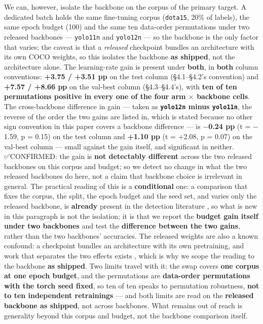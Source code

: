 \documentclass[pdflatex,sn-mathphys-ay]{sn-jnl}
\begin{document}
We can, however, isolate the backbone on the corpus of the primary target. A dedicated batch holds the same fine-tuning corpus (\texttt{dota15}, 20\% of labels), the same epoch budget (100) and the same ten data-order permutations under two released backbones --- \texttt{yolo11n} and \texttt{yolo12n} --- so the backbone is the only factor that varies; the caveat is that a \emph{released} checkpoint bundles an architecture with its own COCO weights, so this isolates the backbone \textbf{as shipped}, not the architecture alone. The learning-rate gain is present under \textbf{both}, in \textbf{both} column conventions: \textbf{+3.75 / +3.51 pp} on the test column (\S{}4.1--\S{}4.2's convention) and \textbf{+7.57 / +8.66 pp} on the val-best column (\S{}4.3--\S{}4.4's), with \textbf{ten of ten permutations positive in every one of the four arm \ensuremath{\times} backbone cells}. The cross-backbone difference in gain --- taken as \textbf{\texttt{yolo12n} minus \texttt{yolo11n}}, the reverse of the order the two gains are listed in, which is stated because no other sign convention in this paper covers a backbone difference --- is \textbf{\ensuremath{-}0.24 pp} (t = \ensuremath{-}1.59, p = 0.15) on the test column and \textbf{+1.10 pp} (t = +2.08, p = 0.07) on the val-best column --- small against the gain itself, and significant in neither. ✅CONFIRMED: the gain is \textbf{not detectably different} across the two released backbones on this corpus and budget; so we detect no change in what the two released backbones do here, not a claim that backbone choice is irrelevant in general. The practical reading of this is a \textbf{conditional} one: a comparison that fixes the corpus, the split, the epoch budget and the seed set, and varies only the released backbone, is \textbf{already} present in the detection literature \citep{ding2023,mahadevkar2024}, so what is new in this paragraph is not the isolation; it is that we report the \textbf{budget gain itself under two backbones} and test the \textbf{difference between the two gains}, rather than the two backbones' accuracies. The released weights are also a known confound: a checkpoint bundles an architecture with its own pretraining, and work that separates the two effects exists \citep{ning2023}, which is why we scope the reading to the backbone \textbf{as shipped}. Two limits travel with it: the swap covers \textbf{one corpus at one epoch budget}, and the permutations are \textbf{data-order permutations with the torch seed fixed}, so ten of ten speaks to permutation robustness, \textbf{not to ten independent retrainings} --- and both limits are read on the \textbf{released backbone as shipped}, not across backbones. What remains out of reach is generality beyond this corpus and budget, not the backbone comparison itself.
\end{document}
